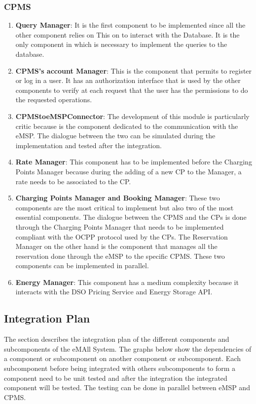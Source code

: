 \subsubsection{CPMS}
\begin{enumerate}
    \item \textbf{Query Manager}: It is the first component to be implemented since all the other component relies on This
    on to interact with the Database. It is the only component in which is necessary to implement the queries to the database.
    \item \textbf{CPMS's account Manager}: This is the component that permits to register or log in a user. It has an authorization interface that 
    is used by the other components to verify at each request that the user has the permissions to do the requested operations.
    \item \textbf{CPMStoeMSPConnector}: The development of this module is particularly critic because is the component dedicated
    to the communication with the eMSP. The dialogue between the two can be simulated during the implementation and tested after the integration.
    \item \textbf{Rate Manager}: This component has to be implemented before the Charging Points Manager because during the adding 
    of a new CP to the Manager, a rate needs to be associated to the CP.
    \item \textbf{Charging Points Manager and Booking Manager}: These two components are the most critical to implement but also two 
    of the most essential components. The dialogue between the CPMS and the CPs is done through the Charging Points Manager that 
    needs to be implemented compliant with the OCPP protocol used by the CPs. The Reservation Manager on the other hand is the component
    that manages all the reservation done through the eMSP to the specific CPMS. These two components can be implemented in parallel.
    \item \textbf{Energy Manager}: This component has a medium complexity because it interacts with the DSO Pricing Service and Energy Storage API. 
\end{enumerate}

\subsection{Integration Plan}
The section describes the integration plan of the different components and subcomponents of the eMAll System. 
The graphs below show the dependencies of a component or subcomponent on another component or subcomponent. Each subcomponent before being integrated with others subcomponents
to form a component need to be unit tested and after the integration the integrated component will be tested.
The testing can be done in parallel between eMSP and CPMS.
